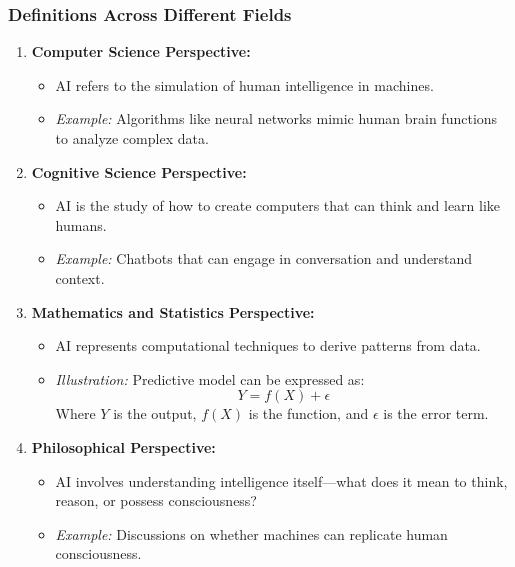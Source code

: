 \documentclass[aspectratio=169]{beamer}
\begin{document}
\begin{frame}[fragile]
    \frametitle{Definitions Across Different Fields}
    
    \begin{enumerate}
        \item \textbf{Computer Science Perspective:}
        \begin{itemize}
            \item AI refers to the simulation of human intelligence in machines.
            \item \textit{Example:} Algorithms like neural networks mimic human brain functions to analyze complex data.
        \end{itemize}
        
        \item \textbf{Cognitive Science Perspective:}
        \begin{itemize}
            \item AI is the study of how to create computers that can think and learn like humans.
            \item \textit{Example:} Chatbots that can engage in conversation and understand context.
        \end{itemize}
        
        \item \textbf{Mathematics and Statistics Perspective:}
        \begin{itemize}
            \item AI represents computational techniques to derive patterns from data.
            \item \textit{Illustration:} Predictive model can be expressed as:
            \begin{equation}
                Y = f(X) + \epsilon
            \end{equation}
            Where $Y$ is the output, $f(X)$ is the function, and $\epsilon$ is the error term.
        \end{itemize}
        
        \item \textbf{Philosophical Perspective:}
        \begin{itemize}
            \item AI involves understanding intelligence itself—what does it mean to think, reason, or possess consciousness?
            \item \textit{Example:} Discussions on whether machines can replicate human consciousness.
        \end{itemize}
    \end{enumerate}
    
\end{frame}
\end{document}
